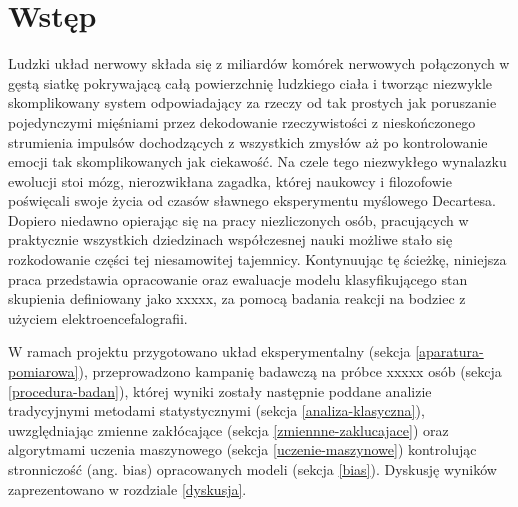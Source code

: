 \documentclass{./assets/wfis}
\begin{document}

\stronatytulowa

\begin{abstract}

\end{abstract}

\chapter{Wstęp}
Ludzki układ nerwowy składa się z miliardów komórek nerwowych połączonych w gęstą siatkę pokrywającą całą powierzchnię ludzkiego ciała i tworząc niezwykle skomplikowany system odpowiadający za rzeczy od tak prostych jak poruszanie pojedynczymi mięśniami przez dekodowanie rzeczywistości z nieskończonego strumienia impulsów dochodzących z wszystkich zmysłów aż po kontrolowanie emocji tak skomplikowanych jak ciekawość. Na czele tego niezwykłego wynalazku ewolucji stoi mózg, nierozwikłana zagadka, której naukowcy i filozofowie poświęcali swoje życia od czasów sławnego eksperymentu myślowego Decartesa. Dopiero niedawno opierając się na pracy niezliczonych osób, pracujących w praktycznie wszystkich dziedzinach współczesnej nauki możliwe stało się rozkodowanie części tej niesamowitej tajemnicy. Kontynuując tę ścieżkę, niniejsza praca przedstawia opracowanie oraz ewaluacje modelu klasyfikującego stan skupienia definiowany jako  xxxxx, za pomocą badania reakcji na bodziec z użyciem elektroencefalografii. 

W ramach projektu przygotowano układ eksperymentalny (sekcja \ref{aparatura-pomiarowa}), przeprowadzono kampanię badawczą na próbce xxxxx osób (sekcja \ref{procedura-badan}), której wyniki zostały następnie poddane analizie tradycyjnymi metodami statystycznymi (sekcja \ref{analiza-klasyczna}), uwzględniając zmienne zakłócające (sekcja \ref{zmiennne-zaklucajace}) oraz algorytmami uczenia maszynowego (sekcja \ref{uczenie-maszynowe}) kontrolując stronniczość (ang. bias) opracowanych modeli (sekcja \ref{bias}). Dyskusję wyników zaprezentowano w rozdziale \ref{dyskusja}.
\end{document}
